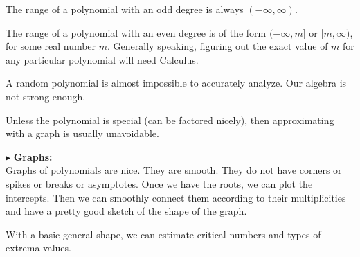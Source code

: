 \documentclass{ximera}
\begin{document}
The range of a polynomial with an odd degree is always $(-\infty, \infty)$. 


The range of a polynomial with an even degree is of the form $(-\infty, m]$ or $[m, \infty)$, for some real number $m$.  Generally speaking, figuring out the exact value of $m$ for any particular polynomial will need Calculus.










\begin{center}

A random polynomial is almost impossible to accurately analyze. Our algebra is not strong enough.


Unless the polynomial is special (can be factored nicely), then approximating with a graph is usually unavoidable.

\end{center}



$\blacktriangleright$ \textbf{\textcolor{red!10!blue!90!}{Graphs:}} \\ 
Graphs of polynomials are nice.  They are smooth.  They do not have corners or spikes or breaks or asymptotes. Once we have the roots, we can plot the intercepts.  Then we can smoothly connect them according to their multiplicities and have a pretty good sketch of the shape of the graph.

With a basic general shape, we can estimate critical numbers and types of extrema values.
\end{document}
